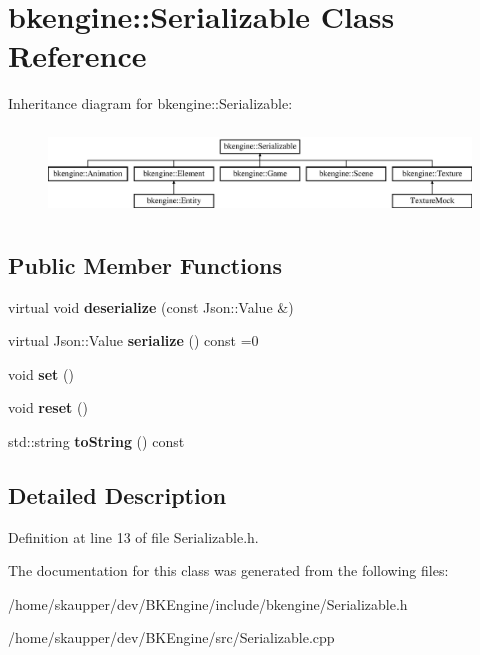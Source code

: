 \hypertarget{classbkengine_1_1Serializable}{}\section{bkengine\+:\+:Serializable Class Reference}
\label{classbkengine_1_1Serializable}
Inheritance diagram for bkengine\+:\+:Serializable\+:\begin{figure}[H]
\begin{center}
\leavevmode
\includegraphics[height=2.349650cm]{classbkengine_1_1Serializable}
\end{center}
\end{figure}
\subsection*{Public Member Functions}
\begin{DoxyCompactItemize}
\item 
\mbox{\label{classbkengine_1_1Serializable_adcb6ba349430cf279d985a31c9251d1f}} 
virtual void {\bfseries deserialize} (const Json\+::\+Value \&)
\item 
\mbox{\label{classbkengine_1_1Serializable_a44d249742000d1818b44bde3ebcfe3ce}} 
virtual Json\+::\+Value {\bfseries serialize} () const =0
\item 
\mbox{\label{classbkengine_1_1Serializable_ad97f199bcd3cfe35b1e29adead7acf74}} 
void {\bfseries set} ()
\item 
\mbox{\label{classbkengine_1_1Serializable_a283a95509d8ab2e8cb6d0ac4b8d2d8d9}} 
void {\bfseries reset} ()
\item 
\mbox{\label{classbkengine_1_1Serializable_a72754434ccc30248fc64faaca277c69b}} 
std\+::string {\bfseries to\+String} () const
\end{DoxyCompactItemize}


\subsection{Detailed Description}


Definition at line 13 of file Serializable.\+h.



The documentation for this class was generated from the following files\+:\begin{DoxyCompactItemize}
\item 
/home/skaupper/dev/\+B\+K\+Engine/include/bkengine/Serializable.\+h\item 
/home/skaupper/dev/\+B\+K\+Engine/src/Serializable.\+cpp\end{DoxyCompactItemize}
